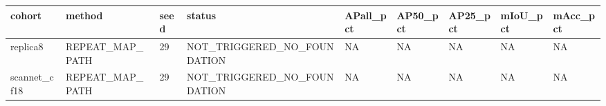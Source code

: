 \begin{tabular}{lllllllll}
\toprule
cohort & method & seed & status & APall\_pct & AP50\_pct & AP25\_pct & mIoU\_pct & mAcc\_pct \\
\midrule
replica8 & REPEAT\_MAP\_PATH & 29 & NOT\_TRIGGERED\_NO\_FOUNDATION & NA & NA & NA & NA & NA \\
scannet\_cf18 & REPEAT\_MAP\_PATH & 29 & NOT\_TRIGGERED\_NO\_FOUNDATION & NA & NA & NA & NA & NA \\
\bottomrule
\end{tabular}

